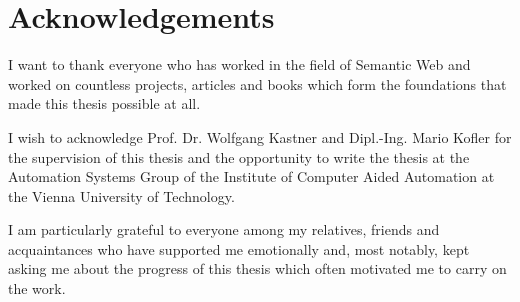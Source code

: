 \chapter*{Acknowledgements}


I want to thank everyone who has worked in the field of Semantic Web and worked on countless projects, articles and books which form the foundations that made this thesis possible at all.

I wish to acknowledge Prof. Dr. Wolfgang Kastner and Dipl.-Ing. Mario Kofler for the supervision of this thesis and the opportunity to write the thesis at the Automation Systems Group of the Institute of Computer Aided Automation at the Vienna University of Technology.

I am particularly grateful to everyone among my relatives, friends and acquaintances who have supported me emotionally and, most notably, kept asking me about the progress of this thesis which often motivated me to carry on the work.